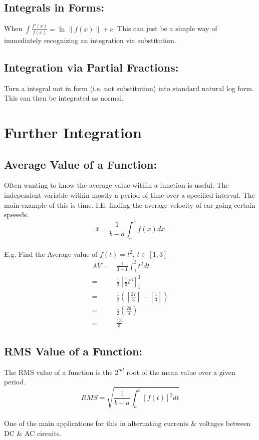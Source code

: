 \documentclass[a5paper]{article}
\begin{document}
	\subsection{Integrals in Forms:}
	When $\int\frac{f'(x)}{f(x)}=\ln{\|f(x)\|}+c$. This can just be a simple way of immediately recognizing an integration via substitution.
	\subsection{Integration via Partial Fractions:}
	Turn a integral not in form (i.e. not substitution) into standard natural log form. This can then be integrated as normal.

	\pagebreak

	\section{Further Integration}
	\subsection{Average Value of a Function:}
	Often wanting to know the average value within a function is useful. The independent variable within mostly a period of time over a specified interval. The main example of this is time. I.E. finding the average velocity of car going certain speeeds.\\
	$$\overline{x}=\frac{1}{b-a}\int^{b}_{a}f(x)dx$$
	\\
	E.g. Find the Average value of $f(t)=t^{2}$, $t\in[1,3]$
	\begin{align*}
		AV=&\frac{1}{3-1}\int^{3}_{1}t^{2}dt\\
		=&\frac{1}{2}[\frac{1}{3}t^{3}]^{3}_{1}\\
		=&\frac{1}{2}([\frac{27}{3}]-[\frac{1}{3}])\\
		=&\frac{1}{2}(\frac{26}{3})\\
		=&\frac{13}{3}
	\end{align*}
	\subsection{RMS Value of a Function:}
	The RMS value of a function is the $2^{nd}$ root of the mean value over a given period.
	\\
	$$RMS=\sqrt{\frac{1}{b-a}\int^{b}_{a}[f(t)]^{2}dt}$$
	\\
	One of the main applications for this in alternating currents \& voltages between DC \& AC circuits.
\end{document}
